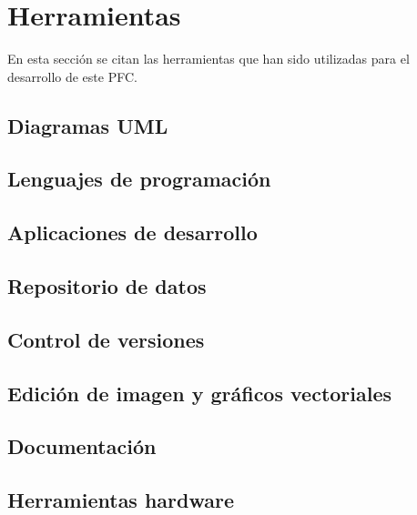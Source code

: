 
\section{Herramientas}
En esta sección se citan las herramientas que han sido utilizadas para el 
desarrollo de este \acs{PFC}.
  \subsection{Diagramas \acs{UML}}
  \subsection{Lenguajes de programación}
  \subsection{Aplicaciones de desarrollo}
  \subsection{Repositorio de datos}
  \subsection{Control de versiones}
  \subsection{Edición de imagen y gráficos vectoriales}
  \subsection{Documentación}
  \subsection{Herramientas hardware}


